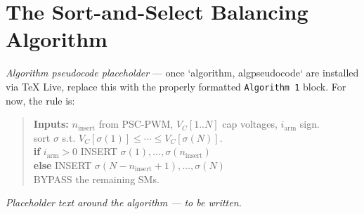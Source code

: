 \documentclass[conference, a4paper]{IEEEtran}
\begin{document}
\section{The Sort-and-Select Balancing Algorithm}
\label{sec:sas}

%
%

\textit{Algorithm pseudocode placeholder} — once `algorithm,
algpseudocode` are installed via TeX Live, replace this with the
properly formatted \texttt{Algorithm 1} block. For now, the rule is:

\begin{quote}\small\ttfamily
\textbf{Inputs:} $n_{\text{insert}}$ from PSC-PWM,
$V_C[1..N]$ cap voltages, $i_{\text{arm}}$ sign. \\
sort $\sigma$ s.t. $V_C[\sigma(1)] \le \cdots \le V_C[\sigma(N)]$. \\
\textbf{if} $i_{\text{arm}} > 0$
  \quad INSERT $\sigma(1), \ldots, \sigma(n_{\text{insert}})$ \\
\textbf{else}
  \quad INSERT $\sigma(N - n_{\text{insert}} + 1), \ldots, \sigma(N)$ \\
BYPASS the remaining SMs.
\end{quote}

\textit{Placeholder text around the algorithm — to be written.}

\end{document}
